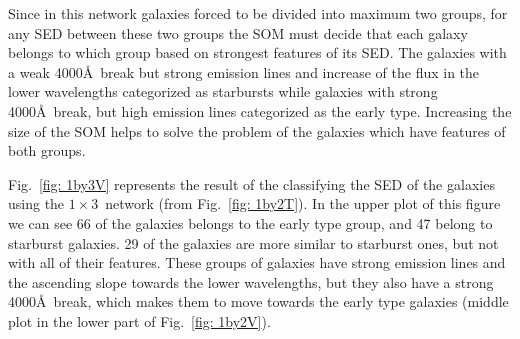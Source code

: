             Since in this network galaxies forced to be divided into maximum two groups, for any SED between these two groups the SOM must decide that each galaxy belongs to which group based on strongest features of its SED.
            The galaxies with a weak 4000\AA~break but strong emission lines and increase of the flux in the lower wavelengths categorized as starbursts while galaxies with strong 4000\AA~break, but high emission lines categorized as the early type.
            Increasing the size of the SOM helps to solve the problem of the galaxies which have features of both groups.
            
             Fig.~\ref{fig: 1by3V} represents the result of the classifying the SED of the galaxies using the $1\times3$~network (from Fig.~\ref{fig: 1by2T}). 
             In the upper plot of this figure we can see 66 of the galaxies belongs to the early type group, and 47 belong to starburst galaxies. 
             29 of the galaxies are more similar to starburst ones, but not with all of their features. 
             These groups of galaxies have strong emission lines and the ascending slope towards the lower wavelengths, but they also have a strong 4000\AA~break, which makes them to move towards the early type galaxies (middle plot in the lower part of Fig.~\ref{fig: 1by2V}). %


